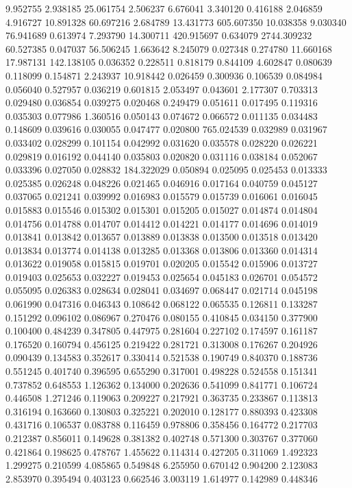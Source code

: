 9.952755
2.938185
25.061754
2.506237
6.676041
3.340120
0.416188
2.046859
4.916727
10.891328
60.697216
2.684789
13.431773
605.607350
10.038358
9.030340
76.941689
0.613974
7.293790
14.300711
420.915697
0.634079
2744.309232
60.527385
0.047037
56.506245
1.663642
8.245079
0.027348
0.274780
11.660168
17.987131
142.138105
0.036352
0.228511
0.818179
0.844109
4.602847
0.080639
0.118099
0.154871
2.243937
10.918442
0.026459
0.300936
0.106539
0.084984
0.056040
0.527957
0.036219
0.601815
2.053497
0.043601
2.177307
0.703313
0.029480
0.036854
0.039275
0.020468
0.249479
0.051611
0.017495
0.119316
0.035303
0.077986
1.360516
0.050143
0.074672
0.066572
0.011135
0.034483
0.148609
0.039616
0.030055
0.047477
0.020800
765.024539
0.032989
0.031967
0.033402
0.028299
0.101154
0.042992
0.031620
0.035578
0.028220
0.026221
0.029819
0.016192
0.044140
0.035803
0.020820
0.031116
0.038184
0.052067
0.033396
0.027050
0.028832
184.322029
0.050894
0.025095
0.025453
0.013333
0.025385
0.026248
0.048226
0.021465
0.046916
0.017164
0.040759
0.045127
0.037065
0.021241
0.039992
0.016983
0.015579
0.015739
0.016061
0.016045
0.015883
0.015546
0.015302
0.015301
0.015205
0.015027
0.014874
0.014804
0.014756
0.014788
0.014707
0.014412
0.014221
0.014177
0.014696
0.014019
0.013841
0.013842
0.013657
0.013889
0.013838
0.013500
0.013518
0.013420
0.013834
0.013774
0.014138
0.013285
0.013368
0.013806
0.013360
0.014314
0.013622
0.019058
0.015815
0.019701
0.020205
0.015542
0.015906
0.013727
0.019403
0.025653
0.032227
0.019453
0.025654
0.045183
0.026701
0.054572
0.055095
0.026383
0.028634
0.028041
0.034697
0.068447
0.021714
0.045198
0.061990
0.047316
0.046343
0.108642
0.068122
0.065535
0.126811
0.133287
0.151292
0.096102
0.086967
0.270476
0.080155
0.410845
0.034150
0.377900
0.100400
0.484239
0.347805
0.447975
0.281604
0.227102
0.174597
0.161187
0.176520
0.160794
0.456125
0.219422
0.281721
0.313008
0.176267
0.204926
0.090439
0.134583
0.352617
0.330414
0.521538
0.190749
0.840370
0.188736
0.551245
0.401740
0.396595
0.655290
0.317001
0.498228
0.524558
0.151341
0.737852
0.648553
1.126362
0.134000
0.202636
0.541099
0.841771
0.106724
0.446508
1.271246
0.119063
0.209227
0.217921
0.363735
0.233867
0.113813
0.316194
0.163660
0.130803
0.325221
0.202010
0.128177
0.880393
0.423308
0.431716
0.106537
0.083788
0.116459
0.978806
0.358456
0.164772
0.217703
0.212387
0.856011
0.149628
0.381382
0.402748
0.571300
0.303767
0.377060
0.421864
0.198625
0.478767
1.455622
0.114314
0.427205
0.311069
1.492323
1.299275
0.210599
4.085865
0.549848
6.255950
0.670142
0.904200
2.123083
2.853970
0.395494
0.403123
0.662546
3.003119
1.614977
0.142989
0.448346

